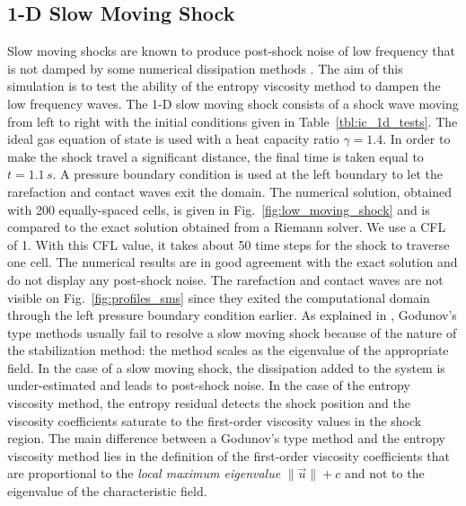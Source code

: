 \documentclass[review,10pt]{elsarticle}
\newcommand{\fig}[1]{Fig.~\ref{#1}}                      %
\newcommand{\tbl}[1]{Table~\ref{#1}}                     %
\begin{document}
\subsection{1-D Slow Moving Shock} \label{sec:slow_moving_shock}

Slow moving shocks are known to produce post-shock noise of low frequency that is not damped by some 
numerical dissipation methods \cite{james}. The aim of this simulation is to test the ability of the 
entropy viscosity method to dampen the low frequency waves.
The 1-D slow moving shock consists of a shock wave moving from left to right with the initial conditions 
given in \tbl{tbl:ic_1d_tests}. The ideal gas equation of state is used with a heat capacity ratio 
$\gamma=1.4$.  In order to make the shock travel a significant distance, the final time is taken 
equal to $t=1.1\,s$. A pressure boundary condition is used at the left boundary to let the rarefaction 
and contact waves exit the domain.   
%
The numerical solution, obtained with 200 equally-spaced cells, is given in \fig{fig:low_moving_shock} 
and is compared to the exact solution obtained from a Riemann solver. We use a CFL of 1. With this 
CFL value, it takes about 50 time steps for the shock to traverse one cell.
%
The numerical results are in good agreement with the exact solution and do not display any post-shock 
noise. The rarefaction and contact waves are not visible on \fig{fig:profiles_sms} since they exited 
the computational domain through the left pressure boundary condition earlier. As explained in 
\cite{roberts}, Godunov's type methods usually fail to resolve a slow moving shock because of the 
nature of the stabilization method: the method scales as the eigenvalue of the appropriate field. 
In the case of a slow moving shock, the dissipation added to the system is under-estimated and leads 
to post-shock noise. In the case of the entropy viscosity method, the entropy residual detects 
the shock position and the viscosity coefficients saturate to the first-order viscosity values in 
the shock region. The main difference between a  Godunov's type method and the entropy viscosity 
method lies in the definition of the first-order viscosity coefficients that are proportional to 
the \emph{local maximum eigenvalue} $\|\vec{u}\|+c$ and not to the eigenvalue of the characteristic field.
%
\end{document}
